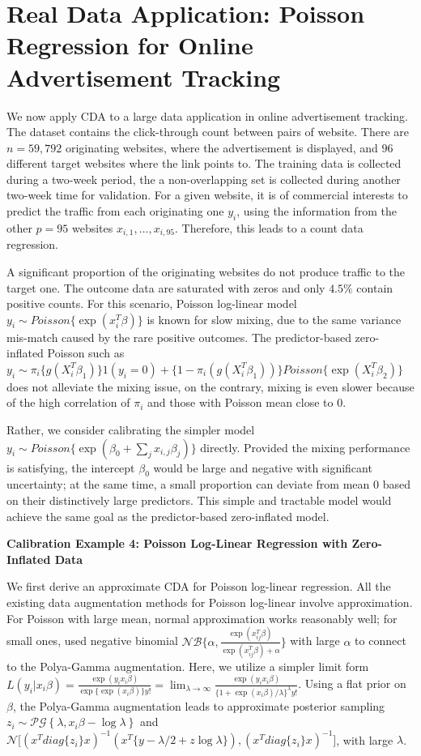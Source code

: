 \documentclass[10pt]{article}
\newcommand{\xbeta}{ x_i \beta}
\newcommand{\xbetaij}{ x_{ij}^T \beta}
\begin{document}
\section{Real Data Application: Poisson Regression for Online Advertisement Tracking}

We now apply CDA to a large data application in online advertisement tracking. The dataset contains the click-through count between pairs of website. There are $n=59,792$ originating websites, where the advertisement is displayed, and $96$ different target websites where the link points to. The training data is collected during a two-week period, the a non-overlapping set is collected during another two-week time for validation. For a given website, it is of commercial interests to predict the traffic from each originating one $y_i$, using the information from the other $p=95$ websites $x_{i,1},\ldots, x_{i,95}$. Therefore, this leads to a count data regression.

A significant proportion of the originating websites do not produce traffic to the target one. The outcome data are saturated with zeros and  only $4.5\%$ contain positive counts. For this scenario, Poisson log-linear model  $y_i\sim Poisson\{\exp(x_i^T\beta)\}$  is known for slow mixing, due to the same variance mis-match caused by the rare positive outcomes. The predictor-based zero-inflated Poisson such as $y_i\sim \pi_i\{ g(X_i^T\beta_1)\}  1(y_i=0)+ \{ 1-\pi_i(g(X_i^T\beta_1)) \} Poisson\{\exp (X_i^T \beta_2)\}$ does not alleviate the mixing issue, on the contrary,  mixing is even slower because of the high correlation of $\pi_i$ and those with Poisson mean close to $0$.

Rather, we consider calibrating the simpler model  $y_i\sim Poisson\{\exp(\beta_0+ \sum_j x_{i,j}\beta_j)\}$ directly. Provided the mixing performance is satisfying, the intercept $\beta_0$ would be large and negative with significant uncertainty; at the same time, a small proportion can deviate from mean $0$ based on their distinctively large predictors. This simple and tractable model would achieve the same goal as the predictor-based zero-inflated model.

{\bf Calibration Example 4: Poisson Log-Linear Regression with Zero-Inflated Data}

We first derive an approximate CDA for Poisson log-linear regression. All the existing data augmentation methods for Poisson log-linear involve approximation. For Poisson with large mean, normal approximation works reasonably well; for small ones, \cite{zhou2012lognormal}  used negative binomial $\mathcal{NB}\{ \alpha,\frac{\exp(\xbetaij)}{\exp(\xbetaij)+\alpha}\}$ with large $\alpha$ to connect to the Polya-Gamma augmentation. Here, we utilize a simpler limit form $L(y_i|\xbeta)=\frac{ \exp(y_i \xbeta)}{\exp\{\exp(\xbeta)\}y!} =\lim_{\lambda\rightarrow\infty}\frac{\exp(y_i \xbeta)}{\{1+ \exp(\xbeta)/\lambda\}^{\lambda}y!}$. Using a flat prior on $\beta$, the Polya-Gamma augmentation leads to approximate posterior sampling $z_i \sim \mathcal{PG}\left\{\lambda, \xbeta -\log \lambda\right\}$ and $\mathcal{N}\big[ (x^T diag\{z_i\} x )^{-1} (x^T  \big \{ y - \lambda/2 + z \log \lambda \big\} ),(x^T diag\{z_i\} x )^{-1} \big]$, with large $\lambda$.
\end{document}
